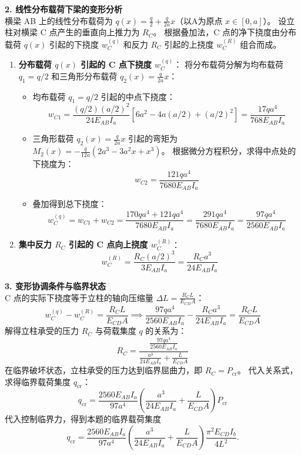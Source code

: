 \documentclass[11pt,a4paper]{ctexrep}
\begin{document}
{\textbf{2. 线性分布载荷下梁的变形分析} \\
横梁 AB 上的线性分布载荷为 $q(x) = \frac{q}{2} + \frac{q}{2a} x$（以A为原点 $x \in [0, a]$）。
设立柱对横梁 C 点产生的垂直向上推力为 $R_C$。
根据叠加法，C 点的净下挠度由分布载荷 $q(x)$ 引起的下挠度 $w_C^{(q)}$ 和反力 $R_C$ 引起的上挠度 $w_C^{(R)}$ 组合而成。
\begin{enumerate}
    \item \textbf{分布载荷 $q(x)$ 引起的 C 点下挠度 $w_C^{(q)}$}：
          将分布载荷分解为均布载荷 $q_1 = q/2$ 和三角形分布载荷 $q_2(x) = \frac{q}{2a} x$：
          \begin{itemize}
              \item 均布载荷 $q_1 = q/2$ 引起的中点下挠度：
                    \[
                        w_{C1} = \frac{(q/2) (a/2)^2}{24 E_{AB} I_a} \left[ 6a^2 - 4a(a/2) + (a/2)^2 \right] = \frac{17 q a^4}{768 E_{AB} I_a}
                    \]
              \item 三角形载荷 $q_2(x) = \frac{q}{2a} x$ 引起的弯矩为 $M_2(x) = -\frac{q}{12a} (2a^3 - 3a^2 x + x^3)$。
                    根据微分方程积分，求得中点处的下挠度为：
                    \[
                        w_{C2} = \frac{121 q a^4}{7680 E_{AB} I_a}
                    \]
              \item 叠加得到总下挠度：
                    \[
                        w_C^{(q)} = w_{C1} + w_{C2} = \frac{170 q a^4 + 121 q a^4}{7680 E_{AB} I_a} = \frac{291 q a^4}{7680 E_{AB} I_a} = \frac{97 q a^4}{2560 E_{AB} I_a}
                    \]
          \end{itemize}
    \item \textbf{集中反力 $R_C$ 引起的 C 点向上挠度 $w_C^{(R)}$}：
          \[
              w_C^{(R)} = \frac{R_C (a/2)^3}{3 E_{AB} I_a} = \frac{R_C a^3}{24 E_{AB} I_a}
          \]
\end{enumerate}

\textbf{3. 变形协调条件与临界状态} \\
C 点的实际下挠度等于立柱的轴向压缩量 $\Delta L = \frac{R_C L}{E_{CD} A}$：
\[
    w_C^{(q)} - w_C^{(R)} = \frac{R_C L}{E_{CD} A} \implies \frac{97 q a^4}{2560 E_{AB} I_a} - \frac{R_C a^3}{24 E_{AB} I_a} = \frac{R_C L}{E_{CD} A}
\]
解得立柱承受的压力 $R_C$ 与荷载集度 $q$ 的关系为：
\[
    R_C = \frac{\frac{97 q a^4}{2560 E_{AB} I_a}}{\frac{a^3}{24 E_{AB} I_a} + \frac{L}{E_{CD} A}}
\]
在临界破坏状态，立柱承受的压力达到临界屈曲力，即 $R_C = P_{\text{cr}}$。
代入关系式，求得临界载荷集度 $q_{\text{cr}}$：
\[
    q_{\text{cr}} = \frac{2560 E_{AB} I_a}{97 a^4} \left( \frac{a^3}{24 E_{AB} I_a} + \frac{L}{E_{CD} A} \right) P_{\text{cr}}
\]
代入控制临界力，得到本题的临界载荷集度
\[
    q_{\text{cr}}
    =
    \frac{2560 E_{AB} I_a}{97a^4}
    \left(
        \frac{a^3}{24E_{AB}I_a}
        +\frac{L}{E_{CD}A}
    \right)
    \frac{\pi^2E_{CD}I_b}{4L^2}.
\]

}
\end{document}
